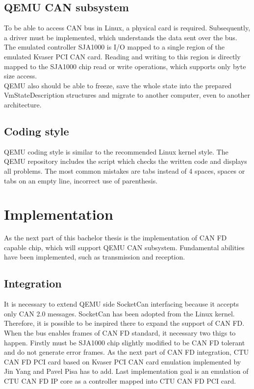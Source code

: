 \documentclass{ctuthesis}
\begin{document}
 \section{QEMU CAN subsystem}
  To be able to access CAN bus in Linux, a physical card is required. Subsequently, a driver must be implemented, which understands the data sent over the bus. \\
  The emulated controller SJA1000 is I/O mapped to a single region of the emulated Kvaser PCI CAN card. Reading and writing to this region is directly mapped to the SJA1000 chip read or write operations, which supports only byte size access. \\
  QEMU also should be able to freeze, save the whole state into the prepared VmStateDescription structures and migrate to another computer, even to another architecture. \\

 \section{Coding style}
  QEMU coding style \cite{qemu-style} is similar to the recommended Linux kernel style.  The QEMU repository includes the script which checks the written code and displays all problems. The most common mistakes are tabs instead of 4 spaces, spaces or tabs on an empty line, incorrect use of parenthesis.

 
\chapter{Implementation}
 As the next part of this bachelor thesis is the implementation of CAN FD capable chip, which will support QEMU CAN subsystem. Fundamental abilities have been implemented, such as transmission and reception. 
 \section{Integration}
  It is necessary to extend QEMU side SocketCan interfacing because it accepts only CAN 2.0 messages. SocketCan has been adopted from the Linux kernel. Therefore, it is possible to be inspired there to expand the support of CAN FD. When the bus enables frames of CAN FD standard, it necessary two thigs to happen. Firstly must be SJA1000 chip slightly modified to be CAN FD tolerant and do not generate error frames. As the next part of CAN FD integration, CTU CAN FD PCI card based on Kvaser PCI CAN card emulation implemented by Jin Yang and Pavel Pisa has to add. Last implementation goal is an emulation of CTU CAN FD IP core as a controller mapped into CTU CAN FD PCI card.
\end{document}
